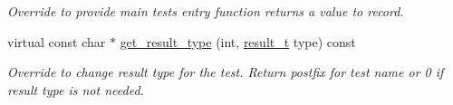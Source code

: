 \begin{DoxyCompactItemize}
\begin{DoxyCompactList}\small\item\em Override to provide main test\textquotesingle{}s entry function returns a value to record. \end{DoxyCompactList}\item 
\hypertarget{classTesterBase_a06eed8a46bdb8f2d731e1de7edbd5a6a}{}virtual const char $\ast$ \hyperlink{classTesterBase_a06eed8a46bdb8f2d731e1de7edbd5a6a}{get\+\_\+result\+\_\+type} (int, \hyperlink{classTesterBase_aa4b9a75a4516a4f3ab9485b437693811}{result\+\_\+t} type) const \label{classTesterBase_a06eed8a46bdb8f2d731e1de7edbd5a6a}

\begin{DoxyCompactList}\small\item\em Override to change result type for the test. Return postfix for test name or 0 if result type is not needed. \end{DoxyCompactList}\end{DoxyCompactItemize}
